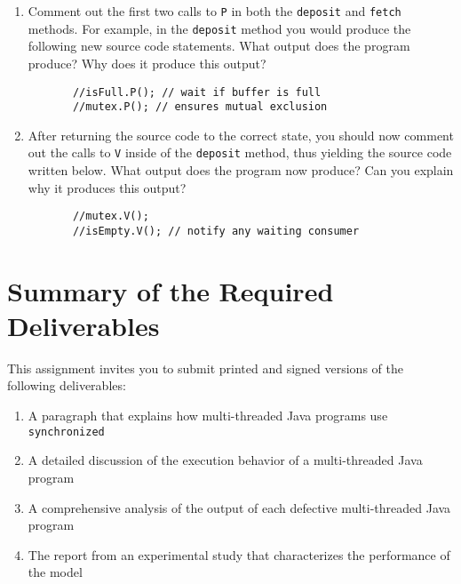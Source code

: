 \begin{enumerate} 
 
  \item Comment out the first two calls to {\tt P} in both the {\tt deposit} and {\tt fetch} methods.  For example, in
    the {\tt deposit} method you would produce the following new source code statements.  What output does the program
    produce?  Why does it produce this output?  

    \vspace*{-.1in}
    \begin{verbatim}
       //isFull.P(); // wait if buffer is full
       //mutex.P(); // ensures mutual exclusion
    \end{verbatim} 
    \vspace*{-.3in}

  \item After returning the source code to the correct state, you should now comment out the calls to {\tt V} inside of
    the {\tt deposit} method, thus yielding the source code written below. What output does the program now produce? Can
    you explain why it produces this output? 

    \vspace*{-.1in}
    \begin{verbatim}
       //mutex.V(); 
       //isEmpty.V(); // notify any waiting consumer
    \end{verbatim} 
    \vspace*{-.3in}


\end{enumerate}


\section*{Summary of the Required Deliverables}

This assignment invites you to submit printed and signed versions of the following deliverables: 

\begin{enumerate} \item A paragraph that explains how multi-threaded Java programs use {\tt synchronized} \item A
    detailed discussion of the execution behavior of a multi-threaded Java program \item A comprehensive analysis of the
    output of each defective multi-threaded Java program \item The report from an experimental study that characterizes
    the performance of the model \end{enumerate}

